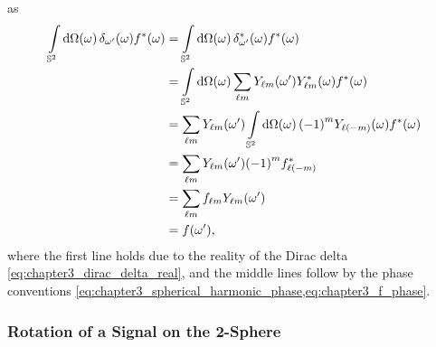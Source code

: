 %
as
%
\begin{align}
	\integrateSphere{\omega} \pixel{\delta_{\omega'}} \pixel{\conj{f}}
	 & = \integrateSphere{\omega} \pixel{\conj{\delta_{\omega'}}} \pixel{\conj{f}} \nonumber{}                                      \\
	 & = \integrateSphere{\omega} \harmonicSum \pixel[']{\harmonic{Y}} \pixel{\conj{\harmonic{Y}}} \pixel{\conj{f}} \nonumber{}     \\
	 & = \harmonicSum \pixel[']{\harmonic{Y}} \integrateSphere{\omega} {(-1)}^{m} \pixel{Y_{\ell(-m)}} \pixel{\conj{f}} \nonumber{} \\
	 & = \harmonicSum \pixel[']{\harmonic{Y}} {(-1)}^{m} \conj{f_{\ell(-m)}} \nonumber{}                                            \\
	 & = \harmonicSum \harmonic{f} \pixel[']{\harmonic{Y}} \nonumber{}                                                              \\
	 & = \pixel[']{f},
\end{align}
%
where the first line holds due to the reality of the Dirac delta \cref{eq:chapter3_dirac_delta_real}, and the middle lines follow by the phase conventions \cref{eq:chapter3_spherical_harmonic_phase,eq:chapter3_f_phase}.

\subsubsection{Rotation of a Signal on the 2-Sphere}

